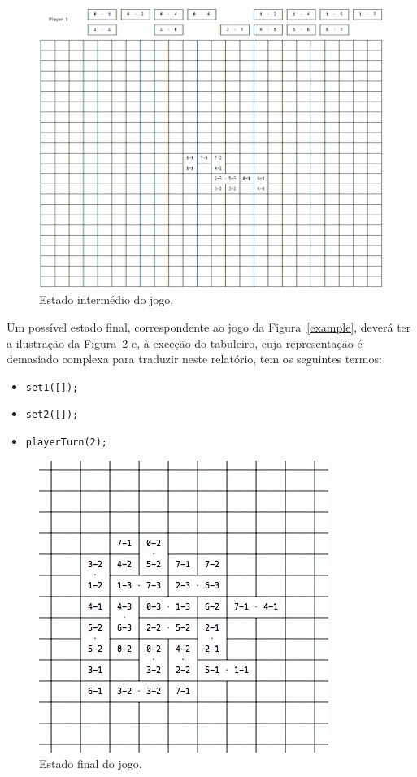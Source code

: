 \documentclass[a4paper]{article}
\begin{document}
\begin{figure}[h!]
\begin{center}
\includegraphics[scale=0.5]{intermediate.jpg}
\caption{Estado intermédio do jogo.}
\label{intermediate}
\end{center}
\end{figure}

Um possível estado final, correspondente ao jogo da Figura~\ref{example}, deverá ter a ilustração da Figura~\ref{over} e, à exceção do tabuleiro, cuja representação é demasiado complexa para traduzir neste relatório, tem os seguintes termos:
\begin{itemize}
\item 
\verb|set1([]);|
\item
\verb|set2([]);|
\item \verb|playerTurn(2);|	
\end{itemize}

\begin{figure}[h!]
\begin{center}
\includegraphics[scale=0.5]{over.jpg}
\caption{Estado final do jogo.}
\label{over}
\end{center}
\end{figure}
\end{document}
